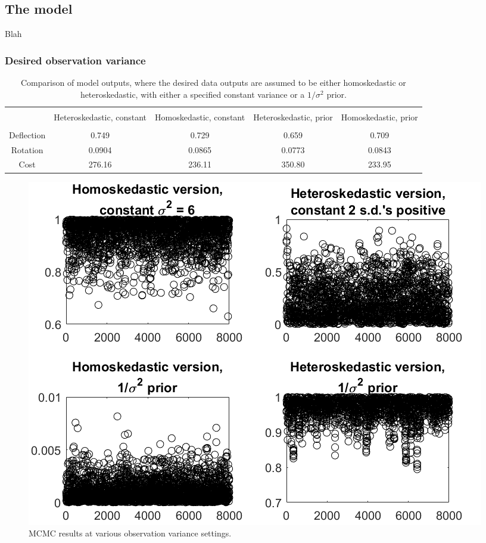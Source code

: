 \documentclass{article}
\begin{document}
\subsection{The model}
Blah

\subsubsection{Desired observation variance}
\begin{table}[h]
\centering
\begin{tabular}{| c | c  |  c  | c |  c  |}
\hline
 \vspace{-3mm}
& & & & \\
& \parbox{24mm}{\centering Heteroskedastic, constant}& \parbox{24mm}{\centering Homoskedastic, constant}& \parbox{24mm}{\centering Heteroskedastic, prior} & \parbox{24mm}{\centering Homoskedastic, prior}\\
 \vspace{-3.5mm}
& & & & \\
\hline
Deflection & 0.749 & 0.729 & 0.659 & 0.709\\
Rotation & 0.0904 & 0.0865 & 0.0773 & 0.0843\\
Cost & 276.16 & 236.11 & 350.80 & 233.95 \\
\hline
\end{tabular}
\caption{Comparison of model outputs, where the desired data outputs are assumed to be either homoskedastic or heteroskedastic, with either a specified constant variance or a $1/\sigma^2$ prior.}
\label{table:obs_var_comp}
\end{table}

\begin{figure}
\centering
\includegraphics[width=.65\linewidth]{comp_obs_var}
\caption{MCMC results at various observation variance settings.}
\label{fig:comp_obs_var}
\end{figure}
\end{document}

